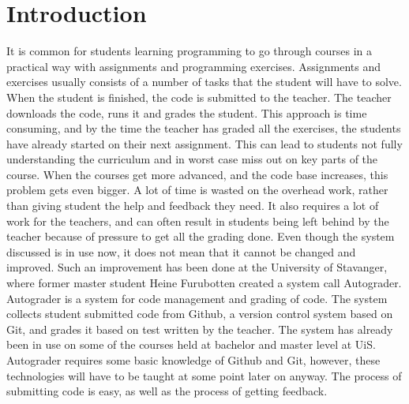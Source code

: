 

%
\maketitle
\chapter{Introduction}

It is common for students learning programming to go through courses in a practical way with assignments and programming exercises. Assignments and exercises usually consists of a number of tasks that the student will have to solve. When the student is finished, the code is submitted to the teacher. The teacher downloads the code, runs it and grades the student. This approach is time consuming, and by the time the teacher has graded all the exercises, the students have already started on their next assignment. This can lead to students not fully understanding the curriculum and in worst case miss out on key parts of the course. When the courses get more advanced, and the code base increases, this problem gets even bigger. A lot of time is wasted on the overhead work, rather than giving student the help and feedback they need. It also requires a lot of work for the teachers, and can often result in students being left behind by the teacher because of pressure to get all the grading done. Even though the system discussed is in use now, it does not mean that it cannot be changed and improved. Such an improvement has been done at the University of Stavanger, where former master student Heine Furubotten created a system call Autograder. Autograder is a system for code management and grading of code. The system collects student submitted code from Github, a version control system based on Git, and grades it based on test written by the teacher. The system has already been in use on some of the courses held at bachelor and master level at UiS. Autograder requires some basic knowledge of Github and Git, however, these technologies will have to be taught at some point later on anyway. The process of submitting code is easy, as well as the process of getting feedback. 

